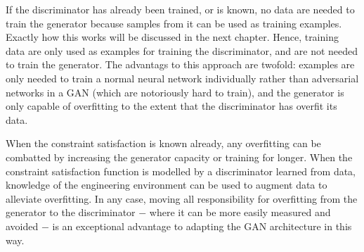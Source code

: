 \documentclass[../../main.tex]{subfiles}
\begin{document}
If the discriminator has already been trained, or is known, no data are needed to train the generator because samples from it can be used as training examples.
Exactly how this works will be discussed in the next chapter.
Hence, training data are only used as examples for training the discriminator, and are not needed to train the generator.
The advantags to this approach are twofold: examples are only needed to train a normal neural network individually rather than adversarial networks in a GAN (which are notoriously hard to train), and the generator is only capable of overfitting to the extent that the discriminator has overfit its data.

When the constraint satisfaction is known already, any overfitting can be combatted by increasing the generator capacity or training for longer.
When the constraint satisfaction function is modelled by a discriminator learned from data, knowledge of the engineering environment can be used to augment data to alleviate overfitting.
In any case, moving all responsibility for overfitting from the generator to the discriminator $-$ where it can be more easily measured and avoided $-$ is an exceptional advantage to adapting the GAN architecture in this way.
\end{document}
